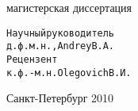 \begin{titlepage}
    \vspace{5em}                                                          
                                                                                        
    \begin{center}                                                        
     магистерская диссертация                                                           
     \end{center}                                                         
    \vspace{6em}                                                          
                                                                                
                                                                                        
    \begin{alltt}                                                         
                       Научный руководитель                                             
                       д.ф.м.н., Andrey В.А.                                            
                       Рецензент                                                        
                       к.ф.-м.н. Olegovich В.И.                                         
    \end{alltt}                                                           
                                                                                        
                                                                                        
    \vspace{\fill}                                                    
                                                                                        
    \begin{center}                                                        
    Санкт-Петербург 2010                                                                
    \end{center}                                                          
                                                                                        
    \end{titlepage}